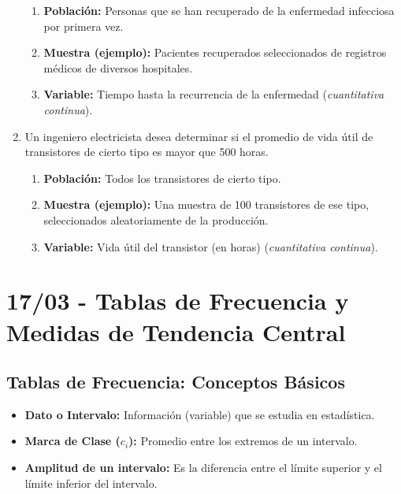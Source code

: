 \documentclass[12pt, letterpaper]{article}
\begin{document}
\begin{enumerate}
	      \begin{enumerate}
		      \item \textbf{Población:} Personas que se han recuperado de la enfermedad infecciosa por primera vez.
		      \item \textbf{Muestra (ejemplo):} Pacientes recuperados seleccionados de registros médicos de diversos hospitales.
		      \item \textbf{Variable:} Tiempo hasta la recurrencia de la enfermedad (\textit{cuantitativa continua}).
	      \end{enumerate}
	\item Un ingeniero electricista desea determinar si el promedio de vida útil de transistores de cierto tipo es mayor que 500 horas.
	      \begin{enumerate}
		      \item \textbf{Población:} Todos los transistores de cierto tipo.
		      \item \textbf{Muestra (ejemplo):} Una muestra de 100 transistores de ese tipo, seleccionados aleatoriamente de la producción.
		      \item \textbf{Variable:} Vida útil del transistor (en horas) (\textit{cuantitativa continua}).
	      \end{enumerate}
\end{enumerate}
\newpage

\section{17/03 - Tablas de Frecuencia y Medidas de Tendencia Central}

\subsection{Tablas de Frecuencia: Conceptos Básicos}
\begin{itemize}
	\item \textbf{Dato o Intervalo:} Información (variable) que se estudia en estadística.
	\item \textbf{Marca de Clase ($c_i$):} Promedio entre los extremos de un intervalo.
	\item \textbf{Amplitud de un intervalo:} Es la diferencia entre el límite superior y el límite inferior del intervalo.
\end{itemize}
\end{document}
